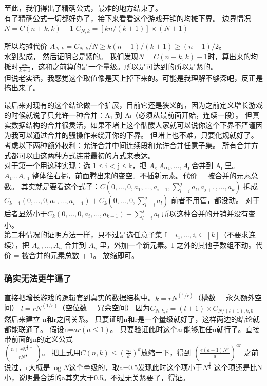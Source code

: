 \documentclass[12pt,a4paper]{article}
\begin{document}
至此，我们得出了精确公式，最难的地方结束了。\\
有了精确公式一切都好办了，接下来看看这个游戏开销的均摊下界。
边界情况 $N = C(n+k, k)-1$
$C_{N,k} = [kn/(k+1)] \times (N+1)$

所以均摊代价 $A_{N,k} = C_{N,k}/N ≥ k(n-1)/(k+1) ≥ (n-1)/2$。\\
水到渠成，
然后证明它是紧的。
我们发现$N=C(n+k,k)-1$时，算出来的均摊时$\frac{kn}{k+1}$，这和之前算的是一个量级。所以是可达到的所以是紧的。\\
但说老实话，我感觉这个取值像是天上掉下来的。可能是我理解不够深吧，反正是搞出来了。

最后来对现有的这个结论做一个扩展，目前它还是狭义的，因为之前定义增长游戏的时候就说了只允许一种合并：A₁ 到 Aᵢ（必须从最前面开始，连续一段）。
但真实数据结构的合并很灵活，如果不堵上这个骷髅人家就可以说你这个下界不严谨因为我可以通过合并的骚操作来绕开你的下界。
但堵上也不难，只要化规就好了。\\
考虑以下两种额外权利：允许合并中间连续段和允许合并任意子集。
所有合并方式都可以由这两种方式连带最初的方式来表达。\\
对于第一个用这种实现：选 1 ≤ i < j ≤ k，把 $Aᵢ, Aᵢ₊₁, ..., Aⱼ$ 合并到 Aⱼ 里。$A₁...Aᵢ₋₁$ 整体往右挪，前面腾出来的变空。不插新元素。代价 = 被合并的元素总数。
其实就是要看这个式子：$C(0,...,0,a_1,...,a_{i-1},\sum_{l=i}^{j}a_l,a_{j+1},...,a_k)$
拆成$C_{k-1}(0,...,0,a_1,...,a_{i-1})+C_k(0,...,0,\sum_{l=i}^{j}a_{l})$
前者不用管，都没动。
对于后者显然小于$C_k(0,...,0,a_i,...,a_{k-1})+\sum_{l=i}^{j}a_{l}$
所以这种合并的开销并没有变小。\\
第二种情况的证明方法一样，只不过是选任意子集 I =$ {i₁, ..., iᵣ} ⊆ [k]$（不要求连续），把 $A_{i₁}, ..., A_{iᵣ}$ 合并到 $A_{iᵣ}$ 里，外加一个新元素。I 之外的其他子数组不动。代价 = 被合并的元素总数 + 1。
放缩即可。\\
\subsubsection{确实无法更牛逼了}
直接把增长游戏的逻辑套到真实的数据结构中。$k = rN^(1/r)$（槽数 = 永久额外空间）
$l = rN^(1/r)$（空位数 = 冗余空间）
因为$C_{N, k, l} = (l+1) \times C_{N/(l+1), k, 0}$
然后来建立
n和r之间关系。
只要证明n和r是一个量级就好了，这样两边的结论就都能联通了。
假设n=$ar(a\le 1)$。
只要验证此时这个ar能够胜任n就行了。直接带前面的n的定义公式\\
$\binom{n+rN^{\frac{1}{r}-1}}{rN^{\frac{1}{r}}}$。
把上式用$C(n,k)\le (\frac{en}{k})^{k}$放缩一下，得到
$(\frac{e(a+1)N^{\frac{1}{r}}}{a})^{ar}$
之前说过，r大概是$\log N$这个量级的，取a=0.5发现此时这个项小于$N^{\frac{3}{4}}$
这个项还是比N小，说明最合适的a其实大于0.5。不过无关紧要了，得证。\\
\end{document}
